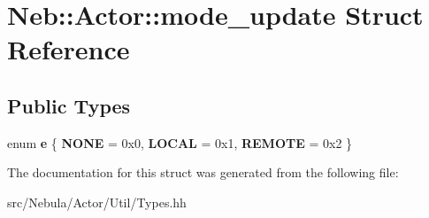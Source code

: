 \hypertarget{structNeb_1_1Actor_1_1mode__update}{\section{\-Neb\-:\-:\-Actor\-:\-:mode\-\_\-update \-Struct \-Reference}
\label{structNeb_1_1Actor_1_1mode__update}
}
\subsection*{\-Public \-Types}
\begin{DoxyCompactItemize}
\item 
enum {\bfseries e} \{ {\bfseries \-N\-O\-N\-E} =  0x0, 
{\bfseries \-L\-O\-C\-A\-L} =  0x1, 
{\bfseries \-R\-E\-M\-O\-T\-E} =  0x2
 \}
\end{DoxyCompactItemize}


\-The documentation for this struct was generated from the following file\-:\begin{DoxyCompactItemize}
\item 
src/\-Nebula/\-Actor/\-Util/\-Types.\-hh\end{DoxyCompactItemize}

